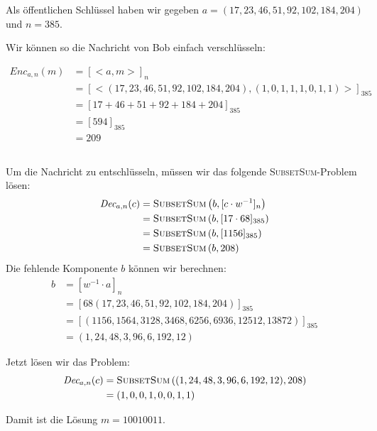 \documentclass{../crypto}
\begin{document}
Als öffentlichen Schlüssel haben wir gegeben 
$a = (17, 23, 46, 51, 92, 102, 184, 204)$ und $n = 385$.

Wir können so die Nachricht von Bob einfach verschlüsseln:

\begin{align*}
  \textit{Enc}_{a,n}(m) & = [<a, m>]_n                                                              \\
                        & = [<(17, 23, 46, 51, 92, 102, 184, 204), (1, 0, 1, 1, 1, 0, 1, 1)>]_{385} \\
                        & = [17 + 46 + 51 + 92 + 184 + 204]_{385}                                   \\
                        & = [594]_{385}                                                             \\
                        & = 209
\end{align*}

\subsection{}

Um die Nachricht zu entschlüsseln, müssen wir das folgende 
\textsc{SubsetSum}-Problem lösen:
\begin{align*}
  \textit{Dec}_{a,n}(c)  & = \text{\textsc{SubsetSum}}\left(b, [c \cdot w^{-1}]_{n}\right) \\
                         & = \text{\textsc{SubsetSum}}\left(b, [17 \cdot 68]_{385}\right)  \\
                         & = \text{\textsc{SubsetSum}}\left(b, [1156]_{385}\right)         \\
                         & = \text{\textsc{SubsetSum}}\left(b, 208\right)                  \\
\end{align*}
Die fehlende Komponente $b$ können wir berechnen:
\begin{align*}
  b  & = [w^{-1} \cdot a]_{n}                                                  \\
     & = \left[68 (17, 23, 46, 51, 92, 102, 184, 204)\right]_{385}             \\
     & = \left[(1156, 1564, 3128, 3468, 6256, 6936, 12512, 13872)\right]_{385} \\
     & = (1, 24, 48, 3, 96, 6, 192, 12)
\end{align*}

Jetzt lösen wir das Problem:
\begin{align*}
  \textit{Dec}_{a, n}(c)  & = \text{\textsc{SubsetSum}}\left((1, 24, 48, 3, 96, 6, 192, 12), 208\right) \\
                          & = (1, 0, 0, 1, 0, 0, 1, 1)
\end{align*}

Damit ist die Lösung $m = 10010011$.
\end{document}
